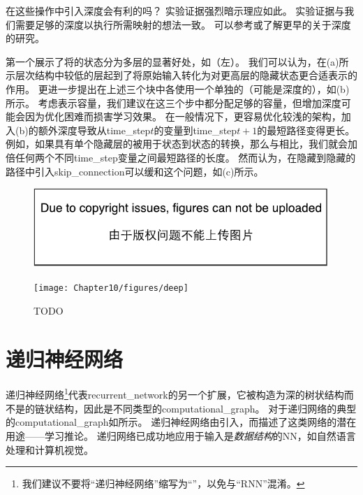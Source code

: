 在这些操作中引入深度会有利的吗？
实验证据\citep{Graves-arxiv2013,Pascanu-et-al-ICLR2014}强烈暗示理应如此。
实验证据与我们需要足够的深度以执行所需映射的想法一致。
可以参考\cite{Schmidhuber96,ElHihi+Bengio-nips8}或\cite{Jaeger2007}了解更早的关于深度的研究。

\cite{Graves-arxiv2013}第一个展示了将的状态分为多层的显著好处，如（左）。
我们可以认为，在(a)所示层次结构中较低的层起到了将原始输入转化为对更高层的隐藏状态更合适表示的作用。
\cite{Pascanu-et-al-ICLR2014}更进一步提出在上述三个块中各使用一个单独的（可能是深度的），如(b)所示。
考虑表示容量，我们建议在这三个步中都分配足够的容量，但增加深度可能会因为优化困难而损害学习效果。
在一般情况下，更容易优化较浅的架构，加入(b)的额外深度导致从\gls{time_step}$t$的变量到\gls{time_step}$t+1$的最短路径变得更长。
例如，如果具有单个隐藏层的被用于状态到状态的转换，那么与相比，我们就会加倍任何两个不同\gls{time_step}变量之间最短路径的长度。
然而\cite{Pascanu-et-al-ICLR2014}认为，在隐藏到隐藏的路径中引入\gls{skip_connection}可以缓和这个问题，如(c)所示。


\begin{figure}[!htb]
\ifOpenSource
\centerline{\includegraphics{figure.pdf}}
\else
\centerline{\texttt{[image: Chapter10/figures/deep]}}
\fi
\caption{TODO}
\label{fig:chap10_deep}
\end{figure}

\section{递归神经网络}
\label{sec:recursive_neural_networks}
递归神经网络\footnote{我们建议不要将``递归神经网络''缩写为``''，以免与``\gls{RNN}''混淆。}代表\gls{recurrent_network}的另一个扩展，它被构造为深的树状结构而不是的链状结构，因此是不同类型的\gls{computational_graph}。
对于递归网络的典型的\gls{computational_graph}如所示。
递归神经网络由\cite{Pollack90}引入，而\cite{tr-bottou-2011}描述了这类网络的潜在用途——学习推论。
递归网络已成功地应用于输入是\emph{数据结构}的\gls{NN}\citep{Frasconi97,Frasconi-1998}，如自然语言处理\citep{Socher+al-NIPS2011,Socher+al-EMNLP2011-small,Socher-et-al-EMNLP2013}和计算机视觉\citep{Socher-2011}。

